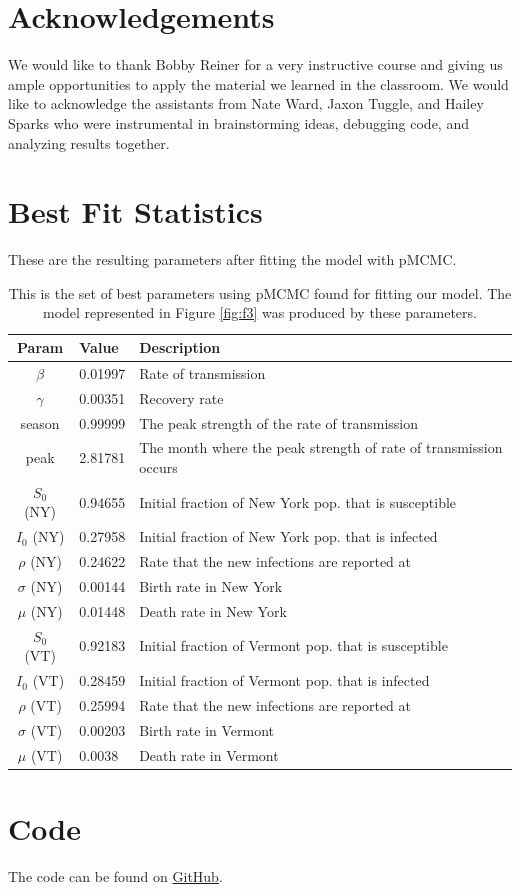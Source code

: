 \documentclass[11pt]{amsart}
\begin{document}
\section*{Acknowledgements}
We would like to thank Bobby Reiner for a very instructive course and giving us ample opportunities to apply the material we learned in the classroom.
We would like to acknowledge the assistants from Nate Ward, Jaxon Tuggle, and Hailey Sparks who were instrumental in brainstorming ideas, debugging code, and analyzing results together.

\newpage
\appendix

\section{Best Fit Statistics}
These are the resulting parameters after fitting the model with pMCMC.
\begin{table}[h]
    \centering
    \begin{tabular}{|c|l|l|} %
        \hline
        \textbf{Param} & \textbf{Value} & \textbf{Description} \\ 
        \hline
        $\beta$ & 0.01997 & Rate of transmission \\
        \hline
        $\gamma$ & 0.00351 & Recovery rate \\
	\hline
        season & 0.99999 & The peak strength of the rate of transmission \\
        \hline
        peak & 2.81781 & The month where the peak strength of rate of transmission occurs \\
        \hline
        $S_0$ (NY) & 0.94655 & Initial fraction of New York pop. that is susceptible \\
        \hline
        $I_0$ (NY) & 0.27958 & Initial fraction of New York pop. that is infected \\
        \hline
        $\rho$ (NY) & 0.24622 & Rate that the new infections are reported at \\
        \hline
        $\sigma$ (NY) & 0.00144 & Birth rate in New York \\
        \hline
        $\mu$ (NY) & 0.01448 & Death rate in New York \\
        \hline
        $S_0$ (VT) & 0.92183 & Initial fraction of Vermont pop. that is susceptible \\
        \hline
        $I_0$ (VT) & 0.28459 & Initial fraction of Vermont pop. that is infected \\
        \hline
        $\rho$ (VT) & 0.25994 & Rate that the new infections are reported at \\
        \hline
        $\sigma$ (VT) & 0.00203 & Birth rate in Vermont \\
        \hline
        $\mu$ (VT) & 0.0038 & Death rate in Vermont \\
        \hline
    \end{tabular}
    \caption{This is the set of best parameters using pMCMC found for fitting our model.
    The model represented in Figure \ref{fig:f3} was produced by these parameters.}
    \label{tab:tab0}
\vspace*{-1mm}
\end{table}

\section{Code}
The code can be found on \href{https://github.com/hunter-lybbert/uw-central/tree/main/disease_dynamics/final_project}{GitHub}.
\end{document}

